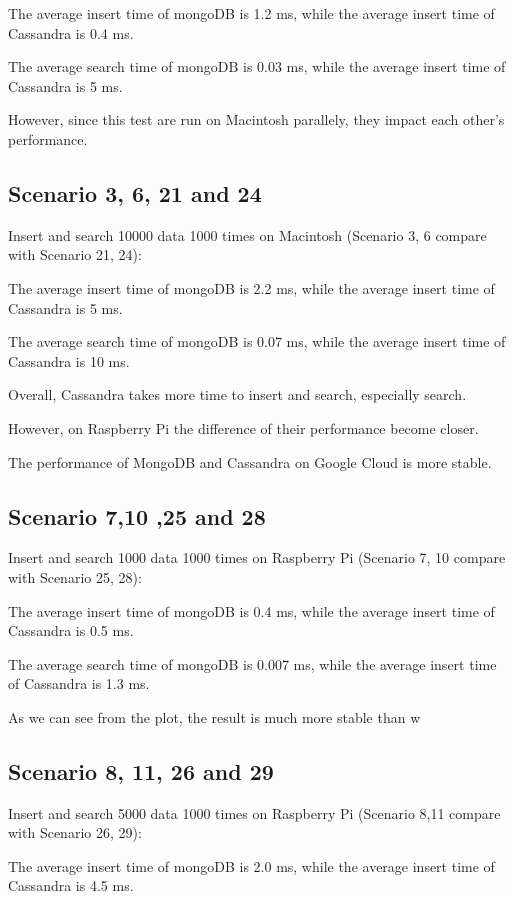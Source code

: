 The average insert time of mongoDB is 1.2 ms, while the average insert time of 
Cassandra is 0.4 ms.

The average search time of mongoDB is 0.03 ms, while the average insert time of 
Cassandra is 5 ms.

However, since this test are run on Macintosh parallely, they impact each other's 
performance.

\subsection{Scenario 3, 6, 21 and 24}
Insert and search 10000 data 1000 times on Macintosh 
(Scenario 3, 6 compare with Scenario 21, 24):

The average insert time of mongoDB is 2.2 ms, while the average insert time of 
Cassandra is 5 ms.

The average search time of mongoDB is 0.07 ms, while the average insert time of 
Cassandra is 10 ms.

Overall, Cassandra takes more time to insert and search, especially search. 

However, on Raspberry Pi the difference of their performance become closer.

The performance of MongoDB and Cassandra on Google Cloud is more stable.



\subsection{Scenario 7,10 ,25 and 28}
Insert and search 1000 data 1000 times on Raspberry Pi 
(Scenario 7, 10 compare with Scenario 25, 28):

The average insert time of mongoDB is 0.4 ms, while the average insert time of 
Cassandra is 0.5 ms.

The average search time of mongoDB is 0.007 ms, while the average insert time of 
Cassandra is 1.3 ms.

As we can see from the plot, the result is much more stable than w

\subsection{Scenario 8, 11, 26 and 29}
Insert and search 5000 data 1000 times on Raspberry Pi 
(Scenario 8,11 compare with Scenario 26, 29):

The average insert time of mongoDB is 2.0 ms, while the average insert time of 
Cassandra is 4.5 ms.

